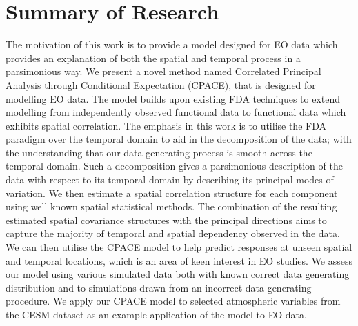 \section{\label{sec:summary_research}Summary of Research}
The motivation of this work is to provide a model designed for EO data which provides an explanation of both the spatial and temporal process in a parsimonious way.
We present a novel method named Correlated Principal Analysis through Conditional Expectation (CPACE), that is designed for modelling EO data.
The model builds upon existing FDA techniques to extend modelling from independently observed functional data to functional data which exhibits spatial correlation.
The emphasis in this work is to utilise the FDA paradigm over the temporal domain to aid in the decomposition of the data; with the understanding that our data generating process is smooth across the temporal domain.
Such a decomposition gives a parsimonious description of the data with respect to its temporal domain by describing its principal modes of variation.
We then estimate a spatial correlation structure for each component using well known spatial statistical methods.
The combination of the resulting estimated spatial covariance structures with the principal directions aims to capture the majority of temporal and spatial dependency observed in the data.
We can then utilise the CPACE model to help predict responses at unseen spatial and temporal locations, which is an area of keen interest in EO studies.
We assess our model using various simulated data both with known correct data generating distribution and to simulations drawn from an incorrect data generating procedure.
We apply our CPACE model to selected atmospheric variables from the CESM dataset as an example application of the model to EO data.

